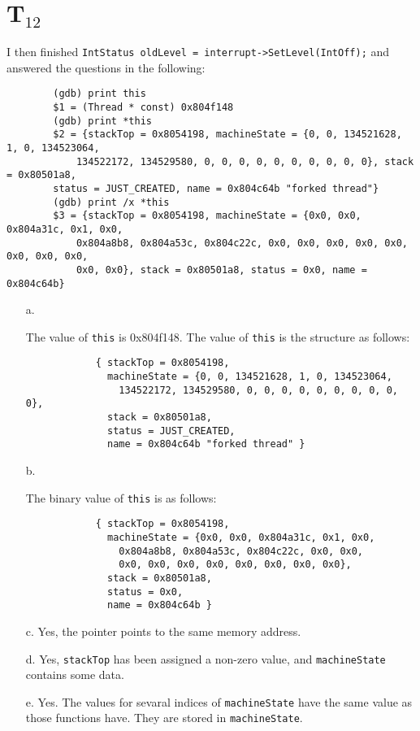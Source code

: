 \documentclass[letterpaper, 10pt]{article}
\begin{document}
	\section*{T$_{12}$}

	I then finished {\tt IntStatus oldLevel = interrupt->SetLevel(IntOff);} and answered the questions in the following:

	\begin{verbatim}
		(gdb) print this
		$1 = (Thread * const) 0x804f148
		(gdb) print *this
		$2 = {stackTop = 0x8054198, machineState = {0, 0, 134521628, 1, 0, 134523064,
			134522172, 134529580, 0, 0, 0, 0, 0, 0, 0, 0, 0, 0}, stack = 0x80501a8,
		status = JUST_CREATED, name = 0x804c64b "forked thread"}
		(gdb) print /x *this
		$3 = {stackTop = 0x8054198, machineState = {0x0, 0x0, 0x804a31c, 0x1, 0x0,
			0x804a8b8, 0x804a53c, 0x804c22c, 0x0, 0x0, 0x0, 0x0, 0x0, 0x0, 0x0, 0x0,
			0x0, 0x0}, stack = 0x80501a8, status = 0x0, name = 0x804c64b}
	\end{verbatim}

	\begin{itemize}
		\item[a.]{The value of {\tt this} is 0x804f148. The value of {\tt *this} is the structure as follows:
		\begin{verbatim}
			{ stackTop = 0x8054198,
			  machineState = {0, 0, 134521628, 1, 0, 134523064,
			    134522172, 134529580, 0, 0, 0, 0, 0, 0, 0, 0, 0, 0},
			  stack = 0x80501a8,
			  status = JUST_CREATED,
			  name = 0x804c64b "forked thread" }
		\end{verbatim}}
		\item[b.]{The binary value of {\tt *this} is as follows:
		\begin{verbatim}
			{ stackTop = 0x8054198,
			  machineState = {0x0, 0x0, 0x804a31c, 0x1, 0x0,
			    0x804a8b8, 0x804a53c, 0x804c22c, 0x0, 0x0,
			    0x0, 0x0, 0x0, 0x0, 0x0, 0x0, 0x0, 0x0},
			  stack = 0x80501a8,
			  status = 0x0,
			  name = 0x804c64b }
		\end{verbatim}}
		\item[c.]{Yes, the pointer points to the same memory address.}
		\item[d.]{Yes, {\tt stackTop} has been assigned a non-zero value, and {\tt machineState} contains some data.}
		\item[e.]{Yes. The values for sevaral indices of {\tt machineState} have the same value as those functions have. They are stored in {\tt machineState}.}
	\end{itemize}
\end{document}
